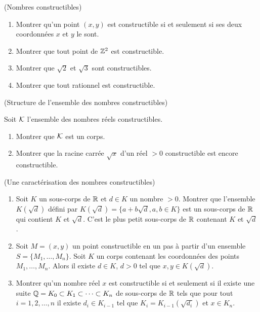 \documentclass[a4paper,11pt,reqno]{amsart}
\begin{document}
\begin{exo} (Nombres constructibles)

  \begin{enumerate}
    \item Montrer qu'un point $(x,y)$ est constructible si et seulement si ses deux coordonnées $x$ et $y$ le sont.
    \item Montrer que tout point de $\mathbb{Z}^2$ est constructible.
    \item Montrer que $\sqrt{2}$ et $\sqrt{3}$ sont constructibles.
    \item Montrer que tout rationnel est constructible.
  \end{enumerate}
\end{exo}


\begin{exo}  (Structure de l'ensemble des nombres constructibles)

  Soit $\mathcal K$ l'ensemble  des nombres réels constructibles.
  \begin{enumerate}
    \item Montrer que $\mathcal K$ est un corps.
    \item Montrer que la racine carrée $\sqrt{x}$ d'un réel $>0$ constructible est encore constructible.
  \end{enumerate}
\end{exo}


\begin{exo} \label{caracterisation} (Une caractérisation des nombres constructibles)

  \begin{enumerate}
    \item Soit $K$ un sous-corps de $\mathbb{R}$ et $d \in K$ un nombre $>0$. Montrer que l'ensemble $K(\sqrt{d})$ défini par $K(\sqrt{d})=\{a+b\sqrt{d}, a, b \in K\}$ est un sous-corps de $\mathbb{R}$ qui contient $K$ et $\sqrt{d}$. C'est le plus petit sous-corps de $\mathbb{R}$ contenant $K$ et $\sqrt{d}$.
    \item Soit $M=(x,y)$ un point constructible en un pas à partir d'un ensemble $S=\{M_1,\ldots,M_n\}$. Soit $K$ un corps contenant les coordonnées des points $M_1,\ldots,M_n$. Alors il existe $d \in K$, $d>0$ tel que $x,y \in K(\sqrt{d})$.
    \item Montrer qu'un nombre réel $x$ est constructible si et seulement si il existe une suite $\mathbb{Q}=K_0 \subset K_1 \subset \cdots \subset K_n$ de sous-corps de $\mathbb{R}$ tels que pour tout $i=1,2,\ldots,n$ il existe $d_i \in K_{i-1}$ tel que $K_i=K_{i-1}(\sqrt{d_i})$ et $x \in K_n$.
  \end{enumerate}
\end{exo}
\end{document}
